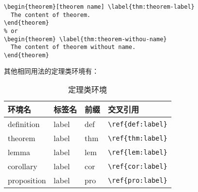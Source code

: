 \documentclass[cn,10pt,math=newtx,citestyle=gb7714-2015,bibstyle=gb7714-2015]{elegantbook}
\begin{document}
\begin{lstlisting}
\begin{theorem}[theorem name] \label{thm:theorem-label}
  The content of theorem.
\end{theorem}
% or 
\begin{theorem} \label{thm:theorem-withou-name}
  The content of theorem without name.
\end{theorem}
\end{lstlisting}

其他相同用法的定理类环境有：

\begin{table}[htbp]
   \centering
   \caption{定理类环境}
     \begin{tabular}{llll}
     \toprule
     环境名 & 标签名 & 前缀 & 交叉引用 \\
     \midrule
     definition & label & def   & \lstinline|\ref{def:label}| \\
     theorem & label & thm   & \lstinline|\ref{thm:label}| \\
     lemma & label & lem   & \lstinline|\ref{lem:label}| \\
     corollary & label & cor   & \lstinline|\ref{cor:label}| \\
     proposition & label & pro   & \lstinline|\ref{pro:label}| \\
     \bottomrule
     \end{tabular}%
   \label{tab:theorem-class}%
 \end{table}%
 

 
\end{document}
